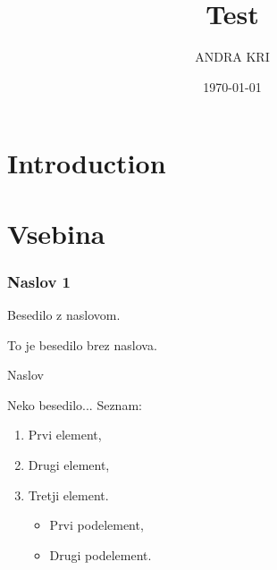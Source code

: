 \documentclass{beamer}
\title{Test}
\author{ANDRA KRI}
\date{\today}
\institute{FSLJ}
\begin{document}
\section{Introduction} %


\frame{\titlepage} %


\section{Vsebina}

\begin{frame}
\frametitle{Naslov 1}
Besedilo z naslovom.    
\end{frame}


\begin{frame}
To je besedilo brez naslova.
    
\end{frame}

\begin{frame}{Naslov}

Neko besedilo... Seznam:

    \begin{enumerate} %
        \item Prvi element,
        \item Drugi element,
        \item Tretji element.

        
        \begin{itemize} %
            \item Prvi podelement,
            \item Drugi podelement.
            
        \end{itemize}

    \end{enumerate}
\end{frame}
\end{document}
